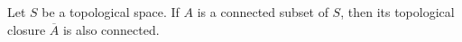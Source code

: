 Let $S$ be a topological space. If $A$ is a connected subset of $S$, then its topological closure $\overline{A}$ is also connected.
